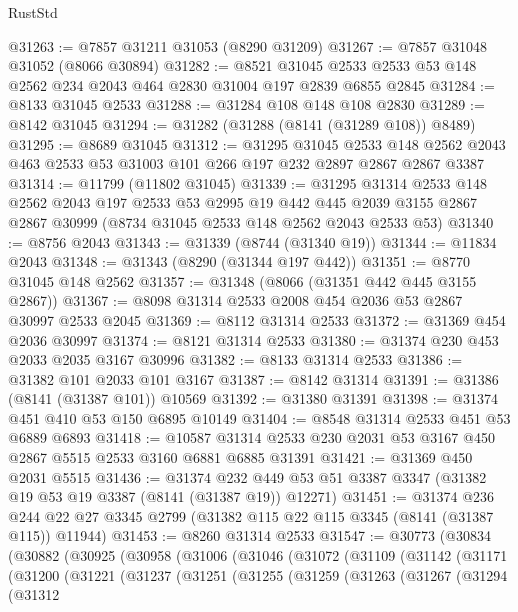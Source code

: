 \begin{lexlean}{RustStd}
\begin{coremodule}
@31263 := @7857 @31211 @31053 (@8290 @31209)
@31267 := @7857 @31048 @31052 (@8066 @30894)
@31282 := @8521
    @31045
    @2533
    @2533
    @53
    @148
    @2562
    @234
    @2043
    @464
    @2830
    @31004
    @197
    @2839
    @6855
    @2845
@31284 := @8133 @31045 @2533
@31288 := @31284 @108 @148 @108 @2830
@31289 := @8142 @31045
@31294 := @31282 (@31288 (@8141 (@31289 @108)) @8489)
@31295 := @8689 @31045
@31312 := @31295
    @31045
    @2533
    @148
    @2562
    @2043
    @463
    @2533
    @53
    @31003
    @101
    @266
    @197
    @232
    @2897
    @2867
    @2867
    @3387
@31314 := @11799 (@11802 @31045)
@31339 := @31295
    @31314
    @2533
    @148
    @2562
    @2043
    @197
    @2533
    @53
    @2995
    @19
    @442
    @445
    @2039
    @3155
    @2867
    @2867
    @30999
    (@8734 @31045 @2533 @148 @2562 @2043 @2533 @53)
@31340 := @8756 @2043
@31343 := @31339 (@8744 (@31340 @19))
@31344 := @11834 @2043
@31348 := @31343 (@8290 (@31344 @197 @442))
@31351 := @8770 @31045 @148 @2562
@31357 := @31348 (@8066 (@31351 @442 @445 @3155 @2867))
@31367 := @8098 @31314 @2533 @2008 @454 @2036 @53 @2867 @30997 @2533 @2045
@31369 := @8112 @31314 @2533
@31372 := @31369 @454 @2036 @30997
@31374 := @8121 @31314 @2533
@31380 := @31374 @230 @453 @2033 @2035 @3167 @30996
@31382 := @8133 @31314 @2533
@31386 := @31382 @101 @2033 @101 @3167
@31387 := @8142 @31314
@31391 := @31386 (@8141 (@31387 @101)) @10569
@31392 := @31380 @31391
@31398 := @31374 @451 @410 @53 @150 @6895 @10149
@31404 := @8548 @31314 @2533 @451 @53 @6889 @6893
@31418 := @10587 @31314 @2533 @230 @2031 @53 @3167 @450 @2867 @5515 @2533 @3160 @6881 @6885 @31391
@31421 := @31369 @450 @2031 @5515
@31436 := @31374
    @232
    @449
    @53
    @51
    @3387
    @3347
    (@31382 @19 @53 @19 @3387 (@8141 (@31387 @19)) @12271)
@31451 := @31374
    @236
    @244
    @22
    @27
    @3345
    @2799
    (@31382 @115 @22 @115 @3345 (@8141 (@31387 @115)) @11944)
@31453 := @8260 @31314 @2533
@31547 := @30773
    (@30834
      (@30882
        (@30925
          (@30958
            (@31006
              (@31046
                (@31072
                  (@31109
                    (@31142
                      (@31171
                        (@31200
                          (@31221
                            (@31237
                              (@31251
                                (@31255
                                  (@31259
                                    (@31263
                                      (@31267
                                        (@31294
                                          (@31312

\end{coremodule}
\end{lexlean}
